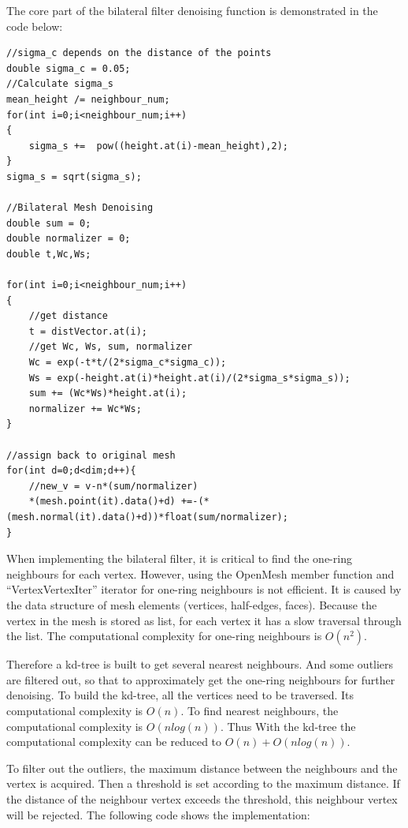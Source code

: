 The core part of the bilateral filter denoising function is demonstrated in the code below:
\begin{lstlisting}[xleftmargin=0em]
//sigma_c depends on the distance of the points
double sigma_c = 0.05; 
//Calculate sigma_s
mean_height /= neighbour_num;
for(int i=0;i<neighbour_num;i++)
{
	sigma_s +=  pow((height.at(i)-mean_height),2);
}
sigma_s = sqrt(sigma_s);

//Bilateral Mesh Denoising
double sum = 0;
double normalizer = 0;
double t,Wc,Ws;

for(int i=0;i<neighbour_num;i++)
{
	//get distance
	t = distVector.at(i);
	//get Wc, Ws, sum, normalizer
	Wc = exp(-t*t/(2*sigma_c*sigma_c));
	Ws = exp(-height.at(i)*height.at(i)/(2*sigma_s*sigma_s));
	sum += (Wc*Ws)*height.at(i);
	normalizer += Wc*Ws;
}

//assign back to original mesh
for(int d=0;d<dim;d++){
	//new_v = v-n*(sum/normalizer)
	*(mesh.point(it).data()+d) +=-(*(mesh.normal(it).data()+d))*float(sum/normalizer);
}
\end{lstlisting}

When implementing the bilateral filter, it is critical to find the one-ring neighbours for each vertex. However, using the OpenMesh member function and ``VertexVertexIter'' iterator for one-ring neighbours is not efficient. It is caused by the data structure of mesh elements (vertices, half-edges, faces). Because the vertex in the mesh is stored as list, for each vertex it has a slow traversal through the list. The computational complexity for one-ring neighbours is $O(n^2)$. 

Therefore a kd-tree is built to get several nearest neighbours. And some outliers are filtered out, so that to approximately get the one-ring neighbours for further denoising. To build the kd-tree, all the vertices need to be traversed. Its computational complexity is $O(n)$. To find nearest neighbours, the computational complexity is $O(nlog(n))$. Thus With the kd-tree the computational complexity can be reduced to $O(n)+O(nlog(n))$.

To filter out the outliers, the maximum distance between the neighbours and the vertex is acquired. Then a threshold is set according to the maximum distance. If the distance of the neighbour vertex exceeds the threshold, this neighbour vertex will be rejected. The following code shows the implementation:

